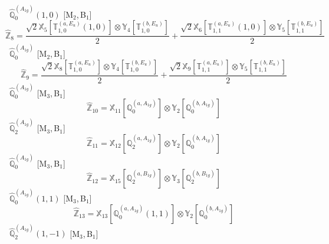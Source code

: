 \documentclass[fleqn,10pt,landscape]{article}
\begin{document}
\begin{itemize}
\begin{dmath*}
\end{dmath*}
\vspace{4mm}
\noindent {} $\,\,\,\hat{\mathbb{Q}}_{0}^{(A_{1g})}(1,0)$ [M$_{2}$,\,B$_{1}$]
\begin{dmath*}
\hat{\mathbb{Z}}_{8}=\frac{\sqrt{2} \mathbb{X}_{5}[\mathbb{T}_{1,0}^{(a,E_{u})}(1,0)] \otimes\mathbb{Y}_{4}[\mathbb{T}_{1,0}^{(b,E_{u})}]}{2} + \frac{\sqrt{2} \mathbb{X}_{6}[\mathbb{T}_{1,1}^{(a,E_{u})}(1,0)] \otimes\mathbb{Y}_{5}[\mathbb{T}_{1,1}^{(b,E_{u})}]}{2}
\end{dmath*}
\vspace{4mm}
\noindent {} $\,\,\,\hat{\mathbb{Q}}_{0}^{(A_{1g})}$ [M$_{2}$,\,B$_{1}$]
\begin{dmath*}
\hat{\mathbb{Z}}_{9}=\frac{\sqrt{2} \mathbb{X}_{8}[\mathbb{T}_{1,0}^{(a,E_{u})}] \otimes\mathbb{Y}_{4}[\mathbb{T}_{1,0}^{(b,E_{u})}]}{2} + \frac{\sqrt{2} \mathbb{X}_{9}[\mathbb{T}_{1,1}^{(a,E_{u})}] \otimes\mathbb{Y}_{5}[\mathbb{T}_{1,1}^{(b,E_{u})}]}{2}
\end{dmath*}
\vspace{4mm}
\noindent {} $\,\,\,\hat{\mathbb{Q}}_{0}^{(A_{1g})}$ [M$_{3}$,\,B$_{1}$]
\begin{dmath*}
\hat{\mathbb{Z}}_{10}=\mathbb{X}_{11}[\mathbb{Q}_{0}^{(a,A_{1g})}] \otimes\mathbb{Y}_{2}[\mathbb{Q}_{0}^{(b,A_{1g})}]
\end{dmath*}
\vspace{4mm}
\noindent {} $\,\,\,\hat{\mathbb{Q}}_{2}^{(A_{1g})}$ [M$_{3}$,\,B$_{1}$]
\begin{dmath*}
\hat{\mathbb{Z}}_{11}=\mathbb{X}_{12}[\mathbb{Q}_{2}^{(a,A_{1g})}] \otimes\mathbb{Y}_{2}[\mathbb{Q}_{0}^{(b,A_{1g})}]
\end{dmath*}
\vspace{4mm}
\noindent {} $\,\,\,\hat{\mathbb{Q}}_{0}^{(A_{1g})}$ [M$_{3}$,\,B$_{1}$]
\begin{dmath*}
\hat{\mathbb{Z}}_{12}=\mathbb{X}_{15}[\mathbb{Q}_{2}^{(a,B_{1g})}] \otimes\mathbb{Y}_{3}[\mathbb{Q}_{2}^{(b,B_{1g})}]
\end{dmath*}
\vspace{4mm}
\noindent {} $\,\,\,\hat{\mathbb{Q}}_{0}^{(A_{1g})}(1,1)$ [M$_{3}$,\,B$_{1}$]
\begin{dmath*}
\hat{\mathbb{Z}}_{13}=\mathbb{X}_{13}[\mathbb{Q}_{0}^{(a,A_{1g})}(1,1)] \otimes\mathbb{Y}_{2}[\mathbb{Q}_{0}^{(b,A_{1g})}]
\end{dmath*}
\vspace{4mm}
\noindent {} $\,\,\,\hat{\mathbb{Q}}_{2}^{(A_{1g})}(1,-1)$ [M$_{3}$,\,B$_{1}$]

\end{itemize}
\end{document}
